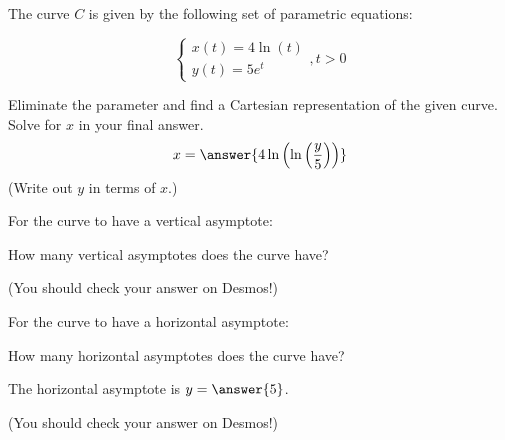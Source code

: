 \documentclass{ximera}
\author{Jim Talamo}
\begin{document}
\begin{exercise}

The curve $C$ is given by the following set of parametric equations:

\[ \begin{cases}
x(t)=   4 \ln (t) \\
y(t)=   5 e^t\end{cases}
, t>0 \]

Eliminate the parameter and find a Cartesian representation of the given curve.  Solve for $x$ in your final answer.
\[
x= \answer{ 4\ln\left(\ln\left(\frac{y}{5} \right)\right)}
\]
(Write out $y$ in terms of $x$.)

\begin{exercise}
For the curve to have a vertical asymptote:

\begin{multipleChoice}
\end{multipleChoice}

How many vertical asymptotes does the curve have?

\begin{multipleChoice}
\end{multipleChoice} 

(You should check your answer on Desmos!)
\end{exercise}


\begin{exercise}
For the curve to have a horizontal asymptote:

\begin{multipleChoice}
\end{multipleChoice}

How many horizontal asymptotes does the curve have?

\begin{multipleChoice}
\end{multipleChoice} 

The horizontal asymptote is $y=\answer{5}$.

(You should check your answer on Desmos!)
\end{exercise}
\end{exercise}
\end{document}
